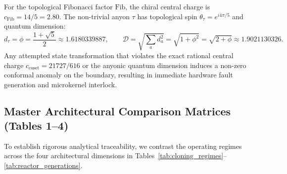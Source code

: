 \documentclass[11pt,onecolumn]{article}
\begin{document}
For the topological Fibonacci factor $\text{Fib}$, the chiral central charge is $c_{\text{Fib}} = 14/5 = 2.80$. The non-trivial anyon $\tau$ has topological spin $\theta_\tau = e^{i 4\pi/5}$ and quantum dimension:
\begin{equation}
d_\tau = \phi = \frac{1 + \sqrt{5}}{2} \approx 1.6180339887, \qquad \mathcal{D} = \sqrt{\sum_a d_a^2} = \sqrt{1 + \phi^2} = \sqrt{2 + \phi} \approx 1.9021130326.
\label{eq:fib_dimension}
\end{equation}
Any attempted state transformation that violates the exact rational central charge $c_{\text{coset}} = 21727/616$ or the anyonic quantum dimension induces a non-zero conformal anomaly on the boundary, resulting in immediate hardware fault generation and microkernel interlock.

\FloatBarrier
\subsection{Master Architectural Comparison Matrices (Tables 1--4)}
To establish rigorous analytical traceability, we contrast the operating regimes across the four architectural dimensions in Tables~\ref{tab:cloning_regimes}--\ref{tab:reactor_generations}.
\end{document}
